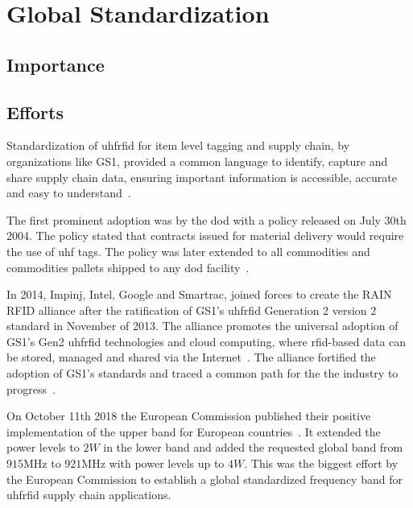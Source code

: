 \section{Global Standardization}

\subsection{Importance}


\subsection{Efforts}

Standardization of \ac{uhfrfid} for item level tagging and supply chain, by organizations like GS1, provided a common language to identify, capture and share supply chain data, ensuring important information is accessible, accurate and easy to understand~\cite{anonymousStandardsGS12014}.

The first prominent adoption was by the \ac{dod} with a policy released on July 30th 2004. The policy stated that contracts issued for material delivery would require the use of \ac{uhf} tags. The policy was later extended to all commodities and commodities pallets shipped to any \ac{dod} facility~\cite{DoDSuppliersPassive, DODReleasesFinal}.

In 2014, Impinj, Intel, Google and Smartrac, joined forces to create the RAIN RFID alliance after the ratification of GS1's \ac{uhfrfid} Generation 2 version 2 standard in November of 2013. The alliance promotes the universal adoption of GS1's Gen2 \ac{uhfrfid} technologies and cloud computing, where \ac{rfid}-based data can be stored, managed and shared via the Internet~\cite{WhatRAINRFID}.
The alliance fortified the adoption of GS1's standards and traced a common path for the the industry to progress~\cite{TechnologyCompaniesCreate}.

On October 11th 2018 the European Commission published their positive implementation of the upper band for European countries~\cite{302208v030101pPdf}.
It extended the power levels to $2W$ in the lower band and added the requested global band from $915$MHz to $921$MHz with power levels up to $4W$. 
This was the biggest effort by the European Commission to establish a global standardized frequency band for \ac{uhfrfid} supply chain applications.


